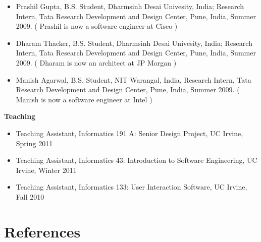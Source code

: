 \documentclass[letterpaper,11pt]{article}
\begin{document}
\begin{itemize}
\vspace{-1pt}\item\small{Prashil Gupta, B.S. Student, Dharmsinh Desai Univesity, India;  Research Intern, Tata Research Development and Design Center, Pune, India, Summer 2009. ( Prashil is now a software engineer at Cisco )} \\
\vspace{-1pt}\item\small{Dharam Thacker, B.S. Student, Dharmsinh Desai Univesity, India;  Research Intern, Tata Research Development and Design Center, Pune, India, Summer 2009. ( Dharam is now an architect at JP Morgan ) }\\
\vspace{-1pt}\item\small{Manish Agarwal, B.S. Student, NIT Warangal, India, Research Intern, Tata Research Development and Design Center, Pune, India, Summer 2009. ( Manish is now a software engineer at Intel )} \\

\end{itemize}

\textbf{Teaching}

\begin{itemize}

\vspace{-1pt}\item\small{Teaching Assistant, Informatics 191 A: Senior Design Project, UC Irvine, Spring 2011} \\
\vspace{-1pt}\item\small{Teaching Assistant, Informatics 43: Introduction to Software Engineering, UC Irvine, Winter 2011} \\
\vspace{-1pt}\item\small{Teaching Assistant, Informatics 133: User Interaction Software, UC Irvine, Fall 2010} 

\end{itemize}

\section{References}
\end{document}
